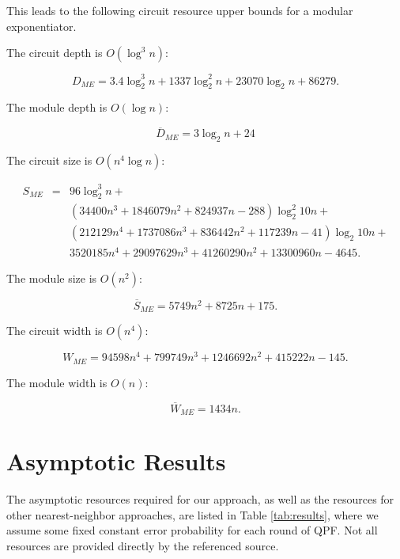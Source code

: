 This leads to the following circuit resource upper bounds for a modular exponentiator.

The circuit depth is $O(\log^3 n)$:

\begin{equation}
D_{ME} = 3.4\log_2^3 n + 1337\log_2^2 n + 23070\log_2 n + 86279\text{.}
\end{equation}

The module depth is $O(\log n)$:

\begin{equation}
\overline{D}_{ME} = 3\log_2 n + 24
\end{equation}

The circuit size is $O(n^4 \log n)$:

\begin{eqnarray}
S_{ME} & = & 96 \log_2^3 n + \nonumber \\
       &   & (34400 n^3 + 1846079 n^2 + 824937 n - 288)\log_2^2 10n + \nonumber \\
       &   & (212129 n^4 + 1737086 n^3 + 836442 n^2 + 117239 n - 41) \log_2 10n + \nonumber \\
       &   & 3520185 n^4 + 29097629 n^3 + 41260290 n^2 + 13300960 n - 4645\text{.}
\end{eqnarray}

The module size is $O(n^2)$:

\begin{equation}
\overline{S}_{ME} = 5749n^2 + 8725n +175\text{.}
\end{equation}

The circuit width is $O(n^4)$:

\begin{equation}
W_{ME} = 94598n^4 + 799749 n^3 + 1246692 n^2 + 415222 n - 145\text{.}
\end{equation}

The module width is $O(n)$:

\begin{equation}
\overline{W}_{ME} = 1434n\text{.}
\end{equation}

%
\section{Asymptotic Results}
\label{sec:results}

The asymptotic resources required for our approach,
as well as the resources for other nearest-neighbor approaches,
are listed in Table \ref{tab:results},
where we assume some fixed constant error
probability for each round of QPF. Not all resources are
provided directly by the referenced source.

